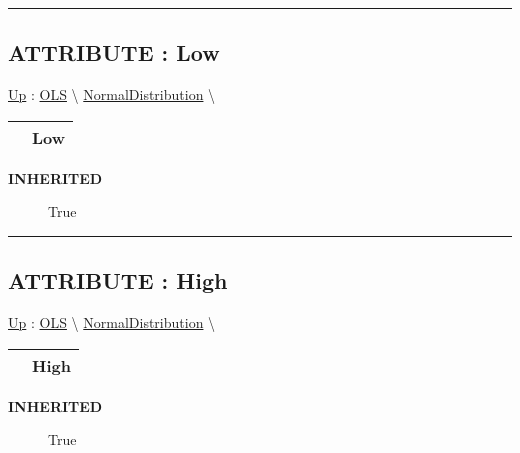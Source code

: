 \rule{\linewidth}{0.5pt}

\subsection*{ATTRIBUTE : Low}
\hypertarget{ecldoc:linearregression.ols.distributionbase.low}{}
\hyperlink{ecldoc:linearregression.ols.normaldistribution}{Up} :
\hspace{0pt} \hyperlink{ecldoc:linearregression.ols}{OLS} \textbackslash 
\hspace{0pt} \hyperlink{ecldoc:linearregression.ols.normaldistribution}{NormalDistribution} \textbackslash 

{\renewcommand{\arraystretch}{1.5}
\begin{tabularx}{\textwidth}{|>{\raggedright\arraybackslash}l|X|}
\hline
\hspace{0pt} & Low \\
\hline
\end{tabularx}
}

\par

\par
\begin{description}
\item [\textbf{INHERITED}] True
\end{description}

\rule{\linewidth}{0.5pt}
\subsection*{ATTRIBUTE : High}
\hypertarget{ecldoc:linearregression.ols.distributionbase.high}{}
\hyperlink{ecldoc:linearregression.ols.normaldistribution}{Up} :
\hspace{0pt} \hyperlink{ecldoc:linearregression.ols}{OLS} \textbackslash 
\hspace{0pt} \hyperlink{ecldoc:linearregression.ols.normaldistribution}{NormalDistribution} \textbackslash 

{\renewcommand{\arraystretch}{1.5}
\begin{tabularx}{\textwidth}{|>{\raggedright\arraybackslash}l|X|}
\hline
\hspace{0pt} & High \\
\hline
\end{tabularx}
}

\par

\par
\begin{description}
\item [\textbf{INHERITED}] True
\end{description}

